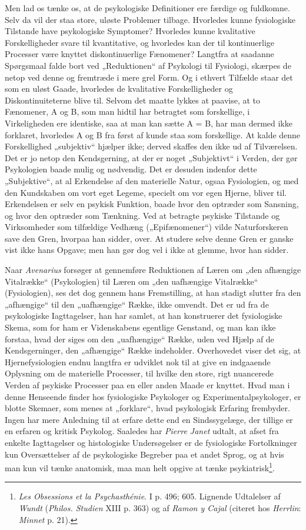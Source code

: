 \documentclass[12pt,a4paper]{book}
\newcommand{\apage}[1]{\marginnote{\footnotesize\textit{[#1]}}}
\begin{document}
Men lad os tænke os, at de psykologiske Definitioner ere færdige og
fuldkomne. Selv da vil der staa store, uløste Problemer tilbage.
Hvorledes kunne fysiologiske Tilstande have psykologiske Symptomer?
Hvorledes kunne kvalitative Forskelligheder svare til kvantitative, og
hvorledes kan der til kontinuerlige Processer være knyttet
diskontinuerlige Fænomener? Langtfra at saadanne Spørgsmaal falde bort
ved „Reduktionen“ af Psykologi til Fysiologi, skærpes de netop ved
denne og fremtræde i mere grel Form. Og i ethvert Tilfælde staar det
som en uløst Gaade, hvorledes de kvalitative Forskelligheder og
Diskontinuiteterne blive til. Selvom det maatte lykkes at paavise, at
to Fænomener, A og B, som man hidtil har betragtet som forskellige, i
Virkeligheden ere identiske, saa at man kan sætte A = B, har man
dermed ikke forklaret, hvorledes A og B fra først af kunde staa som
forskellige. At kalde denne Forskellighed „subjektiv“ hjælper ikke;
derved skaffes den ikke ud af Tilværelsen. Det er jo netop den
Kendsgerning, at der er noget „Subjektivt“ i Verden, der gør
Psykologien baade mulig og nødvendig. Det er desuden indenfor dette
„Subjektive“, at al Erkendelse af den materielle Natur, ogsaa
Fysiologien, og med den Kundskaben om vort eget Legeme, specielt om
vor egen Hjerne, bliver til. Erkendelsen er selv en psykisk Funktion,
baade hvor den optræder som Sansning, og hvor den \apage{27} optræder som
Tænkning. Ved at betragte psykiske Tilstande og Virksomheder som
tilfældige Vedhæng („Epifænomener“) vilde Naturforskeren save den
Gren, hvorpaa han sidder, over. At studere selve denne Gren er ganske
vist ikke hans Opgave; men han gør dog vel i ikke at glemme, hvor han
sidder.

Naar \emph{Avenarius} forsøger at gennemføre Reduktionen af Læren om
„den afhængige Vitalrække“ (Psykologien) til Læren om „den uafhængige
Vitalrække“ (Fysiologien), ses det dog gennem hans Fremstilling, at
han stadigt slutter fra den „afhængige“ til den „uafhængige“ Række,
ikke omvendt. Det er ud fra de psykologiske Iagttagelser, han har
samlet, at han konstruerer det fysiologiske Skema, som for ham er
Videnskabens egentlige Genstand, og man kan ikke forstaa, hvad der
siges om den „uafhængige“ Række, uden ved Hjælp af de Kendsgerninger,
den „afhængige“ Række indeholder. Overhovedet viser det sig, at
Hjernefysiologien endnu langtfra er udviklet nok til at give en
indgaaende Oplysning om de materielle Processer, til hvilke den store,
rigt nuancerede Verden af psykiske Processer paa en eller anden Maade
er knyttet. Hvad man i denne Henseende finder hos fysiologiske
Psykologer og Experimentalpsykologer, er blotte Skemaer, som menes at
„forklare“, hvad psykologisk Erfaring frembyder. Ingen har mere
Anledning til at erfare dette end en Sindssygelæge, der tillige er en
erfaren og kritisk Psykolog. Saaledes har \emph{Pierre Janet} udtalt,
at afset fra enkelte Iagttagelser og histologiske Undersøgelser er de
fysiologiske Fortolkninger kun Oversættelser af de psykologiske
Begreber paa et andet Sprog, og at hvis man kun vil tænke anatomisk,
maa man helt opgive at tænke psykiatrisk\footnote{\emph{Les Obsessions
et la Psychasthénie}. I p. 496; 605. Lignende Udtalelser af
\emph{Wundt} (\emph{Philos. Studien} XIII p. 363) og af \emph{Ramon y
Cajal} (citeret hos \emph{Herrlin}: \emph{Minnet} p. 21).}.
\end{document}
